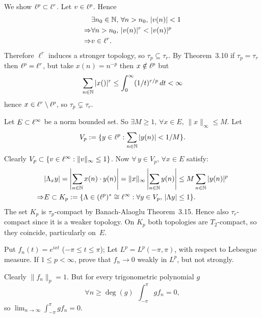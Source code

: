 \begin{enumerate}
\begin{itemize}
We show \(\ell^p \subset \ell^r\). Let \(v\in \ell^p\). Hence
\begin{align*}
& \exists n_0\in\mathbb{N},\,\forall n>n_0,\,|v(n)|<1 \\
\Rightarrow & \forall n>n_0,\, |v(n)|^r < |v(n)|^p \\
\Rightarrow & v\in \ell^r.
\end{align*}
Therefore \(\ell^r\) induces a stronger topology, so \(\tau_p \subseteq \tau_r\).
By Theorem~3.10 if \(\tau_p = \tau_r\) then \(\ell^p = \ell^r\),
but take \(x(n)=n^{-p}\) then \(x\notin \ell^p\)
but
\begin{equation*}
\sum_{n\in\mathbb{N}} |x()|^r \leq \int_0^\infty (1/t)^{r/p}\,dt  < \infty
\end{equation*}
hence \(x\in\ell^r\setminus\ell^p\), so \(\tau_p \subsetneq \tau_r\).

Let \(E\subset \ell^\infty\) be a norm bounded set.
So \(\exists M\geq 1,\,\forall x\in E,\,\|x\|_\infty \leq M\).
Let
\begin{equation*}
V_p := \{y\in\ell^p: \sum_{n\in\mathbb{N}} |y(n)|<1/M\}.
\end{equation*}
Clearly \(V_p \subset \{v\in\ell^\infty: \|v\|_\infty \leq 1\}\).
Now  \(\forall\, y\in V_p,\, \forall x\in E\) satisfy:
\begin{align*}
& |\Lambda_x y| = \left|\sum_{n\in\mathbb{N}} x(n)\cdot y(n)\right|
                = \|x\|_\infty \left|\sum_{n\in\mathbb{N}} y(n)\right|
                \leq M \sum_{n\in\mathbb{N}} |y(n)|^p \\
\Rightarrow &
  E \subset K_p :=
  \{\Lambda \in (\ell^p)^*\cong \ell^\infty: \forall y\in V_p,\, |\Lambda y|\leq 1\}.
\end{align*}
The set \(K_p\) is \(\tau_p\)-compact by
Banach-Alaoglu Theorem~3.15.
Hence also \(\tau_r\)-compact since it is a weaker topology.
On \(K_p\) both topologies are \(T_2\)-compact, so they coincide, particularly
on~$E$.
\end{itemize}


\begin{excopy}
Put \(f_n(t)=e^{ixt}\) (\(-\pi \leq t \leq \pi\)); Let
\(L^p = L^p(-\pi,\pi)\), with respect to Lebesgue measure.
If \(1\leq p < \infty\), prove that \(f_n\to 0\) weakly in \(L^p\),
but not strongly.
\end{excopy}

Clearly \(\|f_n\|_p = 1\). But for every trigonometric polynomial $g$
\begin{equation*}
\forall n \geq \deg(g)\,\; \int_{-\pi}^\pi g f_n = 0,
\end{equation*}
so \(\lim_{n\to\infty}\int_{-\pi}^{\pi} gf_n = 0\).


\end{enumerate}
